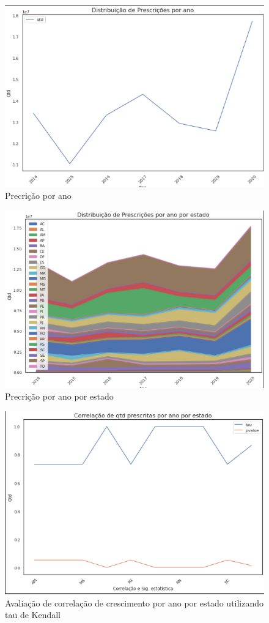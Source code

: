     \begin{figure}[!ht]
        \centering
        \includegraphics[width=0.8\linewidth]{04-figuras/distribuicao_presc_ano.png}
        \caption{Precrição por ano}
        \label{fig:presc_ano}
    \end{figure}
    \begin{figure}[!ht]
        \centering
        \includegraphics[width=0.8\linewidth]{04-figuras/distribuicao_presc_ano_estado.png}
        \caption{Precrição por ano por estado}
        \label{fig:presc_ano_estadp}
    \end{figure}
    \begin{figure}[!ht]
        \centering
        \includegraphics[width=0.8\linewidth]{04-figuras/corelaticao_estados.png}
        \caption{Avaliação de correlação de crescimento por ano por estado utilizando tau de Kendall}
        \label{fig:tau}
    \end{figure}

